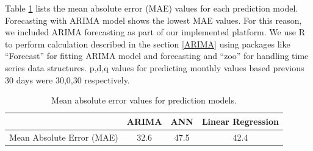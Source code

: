 Table \ref{tab:mae} lists the mean absolute error (MAE) values for each prediction model. Forecasting with ARIMA model shows the lowest MAE values. For this reason, we included ARIMA forecasting as part of our implemented platform. We use R to perform calculation described in the section \ref{ARIMA} using packages like ``Forecast'' for fitting ARIMA model and forecasting and ``zoo'' for handling time series data structures. p,d,q values for predicting monthly values based previous 30 days were 30,0,30 respectively.

\begin{center}
\begin{table}[!ht] 
\begin{tabular} { | l | c | c | c | } 

\hline
	 & ARIMA & ANN & Linear Regression \\ \hline
	Mean Absolute Error (MAE) & 32.6 & 47.5 & 42.4 \\ \hline
\end{tabular}
\caption{Mean absolute error values for prediction models.}
\label{tab:mae}
\end{table}
\end{center}

  